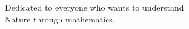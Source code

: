 \cleardoublepage

\thispagestyle{empty}

\vspace*{\fill}

\begin{center}
	\itshape
	
	Dedicated to everyone who wants to understand\\
	Nature through mathematics.
	
\end{center}

\vspace*{\fill}

